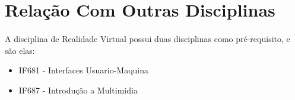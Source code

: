 \documentclass{article}
\begin{document}
\section{Relação Com Outras Disciplinas}

\paragraph{} A disciplina de Realidade Virtual possui duas disciplinas como pré-requisito, e são elas:

\begin{itemize}
    \item IF681 - Interfaces Usuario-Maquina
    \item IF687 - Introdução a Multimidia
\end{itemize}



\end{document}
